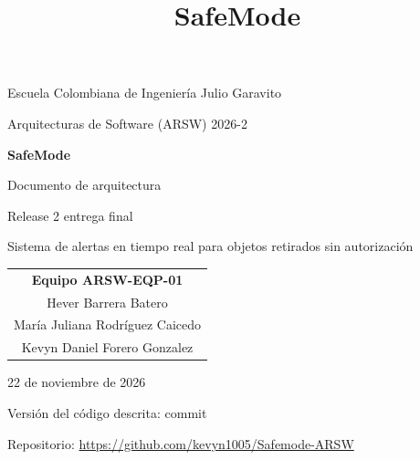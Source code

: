 \documentclass[11pt,a4paper]{report}
\title{SafeMode}
\author{}
\date{}
\begin{document}
\begin{titlepage}
  \centering
  {\large Escuela Colombiana de Ingeniería Julio Garavito\par}
  {\large Arquitecturas de Software (ARSW) \textperiodcentered{} 2026-2\par}
  \vspace{2.2cm}
  {\Huge\bfseries\color{azul} SafeMode\par}
  \vspace{0.4cm}
  {\Large Documento de arquitectura\par}
  {\large Release 2 \textperiodcentered{} entrega final\par}
  \vspace{1.6cm}
  {\large Sistema de alertas en tiempo real para objetos retirados sin autorización\par}
  \vspace{2.4cm}
  \begin{tabular}{c}
    \textbf{Equipo ARSW-EQP-01}\\[0.5em]
    Hever Barrera Batero\\
    María Juliana Rodríguez Caicedo\\
    Kevyn Daniel Forero Gonzalez
  \end{tabular}
  \vfill
  {\normalsize 22 de noviembre de 2026\par}
  {\small Versión del código descrita: commit \texttt{\versionrepo}\par}
  {\small Repositorio: \url{https://github.com/kevyn1005/Safemode-ARSW}\par}
\end{titlepage}

\tableofcontents
\clearpage
\listoffigures
\clearpage
\listoftables
\clearpage
{}












\end{document}
